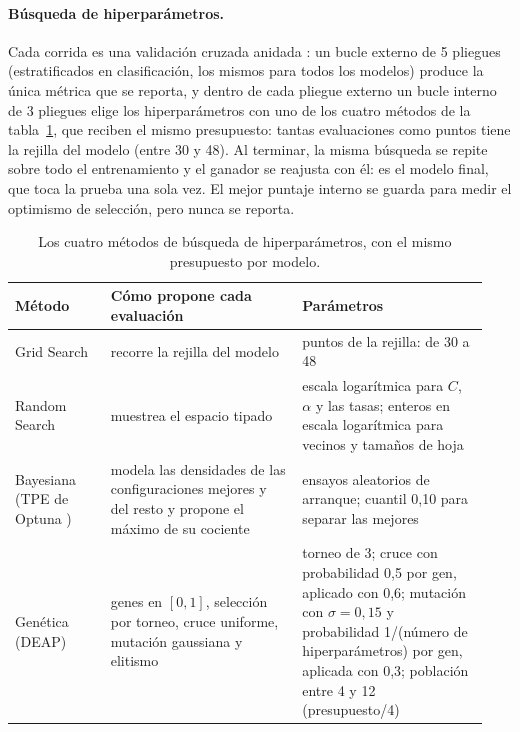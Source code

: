 \paragraph{Búsqueda de hiperparámetros.}
Cada corrida es una validación cruzada anidada \citep{cawley2010overfitting}: un bucle externo de 5
pliegues (estratificados en clasificación, los mismos para todos los modelos) produce la única métrica que
se reporta, y dentro de cada pliegue externo un bucle interno de 3 pliegues elige los hiperparámetros con uno
de los cuatro métodos de la tabla~\ref{tab:optimizadores}, que reciben el mismo presupuesto: tantas
evaluaciones como puntos tiene la rejilla del modelo (entre 30 y 48). Al terminar, la misma búsqueda se
repite sobre todo el entrenamiento y el ganador se reajusta con él: es el modelo final, que toca la prueba
una sola vez. El mejor puntaje interno se guarda para medir el optimismo de selección, pero nunca se reporta.

\begin{table}[t]
  \centering\small
  \caption{Los cuatro métodos de búsqueda de hiperparámetros, con el mismo presupuesto por modelo.}
  \label{tab:optimizadores}
  \begin{tabular}{@{}>{\raggedright\arraybackslash}p{0.19\linewidth} >{\raggedright\arraybackslash}p{0.38\linewidth} >{\raggedright\arraybackslash}p{0.37\linewidth}@{}}
    \toprule
    Método & Cómo propone cada evaluación & Parámetros \\
    \midrule
    Grid Search & recorre la rejilla del modelo & puntos de la rejilla: de 30 a 48 \\
    Random Search & muestrea el espacio tipado & escala logarítmica para $C$, $\alpha$ y las tasas; enteros en escala logarítmica para vecinos y tamaños de hoja \\
    Bayesiana (TPE de Optuna \citep{akiba2019optuna}) & modela las densidades de las configuraciones mejores y del resto y propone el máximo de su cociente & 10 ensayos aleatorios de arranque; cuantil 0,10 para separar las mejores \\
    Genética (DEAP) & genes en $[0, 1]$, selección por torneo, cruce uniforme, mutación gaussiana y elitismo & torneo de 3; cruce con probabilidad 0,5 por gen, aplicado con 0,6; mutación con $\sigma = 0{,}15$ y probabilidad 1/(número de hiperparámetros) por gen, aplicada con 0,3; población entre 4 y 12 (presupuesto/4) \\
    \bottomrule
  \end{tabular}
\end{table}

